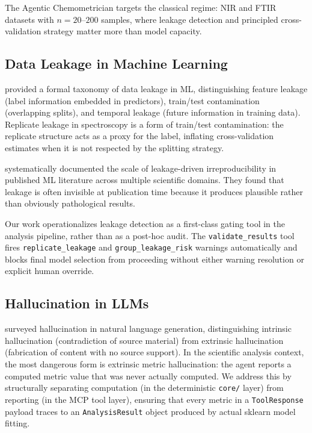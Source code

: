 The Agentic Chemometrician targets the classical regime: NIR and FTIR datasets
with $n = 20$--$200$ samples, where leakage detection and principled
cross-validation strategy matter more than model capacity.

\subsection{Data Leakage in Machine Learning}

\citet{kaufman2012leakage} provided a formal taxonomy of data leakage in ML,
distinguishing feature leakage (label information embedded in predictors),
train/test contamination (overlapping splits), and temporal leakage
(future information in training data).
Replicate leakage in spectroscopy is a form of train/test contamination:
the replicate structure acts as a proxy for the label, inflating
cross-validation estimates when it is not respected by the splitting strategy.

\citet{kapoor2023leakage} systematically documented the scale of leakage-driven
irreproducibility in published ML literature across multiple scientific domains.
They found that leakage is often invisible at publication time because it
produces plausible rather than obviously pathological results.

Our work operationalizes leakage detection as a first-class gating tool in
the analysis pipeline, rather than as a post-hoc audit.
The \texttt{validate\_results} tool fires \texttt{replicate\_leakage} and
\texttt{group\_leakage\_risk} warnings automatically and blocks final model
selection from proceeding without either warning resolution or explicit human
override.

\subsection{Hallucination in LLMs}

\citet{ji2023survey} surveyed hallucination in natural language generation,
distinguishing intrinsic hallucination (contradiction of source material) from
extrinsic hallucination (fabrication of content with no source support).
In the scientific analysis context, the most dangerous form is extrinsic
metric hallucination: the agent reports a computed metric value that was
never actually computed.
We address this by structurally separating computation (in the deterministic
\texttt{core/} layer) from reporting (in the MCP tool layer), ensuring that
every metric in a \texttt{ToolResponse} payload traces to an
\texttt{AnalysisResult} object produced by actual sklearn model fitting.
